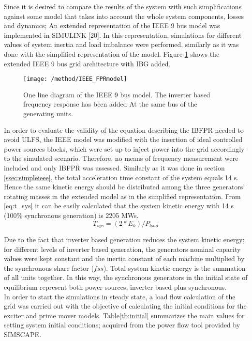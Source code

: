 Since it is desired to compare the results of the system with such simplifications against some model that takes into account the whole system components, losses and dynamics; An  extended representation of the IEEE 9 bus model was implemented in SIMULINK [20]. In this representation, simulations for different values of system inertia and load imbalance were performed, similarly as it was done with the simplified representation of the model. Figure \ref{fig:ieeeext} shows the extended IEEE 9 bus grid architecture with IBG added.\\
\begin{figure}[h]
	\centering
	\texttt{[image: /method/IEEE\_FPRmodel]}
	\caption{One line diagram of the IEEE 9 bus model. The inverter based frequency response has been added At the same bus of the generating units.}
	\label{fig:ieeeext}
\end{figure}
In order to evaluate the validity of the equation describing the IBFPR needed to avoid ULFS, the IEEE model was modified with the insertion of ideal controlled power sources blocks, which were set up to inject power into the grid accordingly to the simulated scenario. Therefore, no means of frequency measurement were included and only IBFPR was assessed.
Similarly as it was done in section \ref{ssec:simpleieee}, the total acceleration time constant of the system equals 14 s. Hence the same kinetic energy should be distributed among the three generators' rotating masses in the extended model as in the simplified representation. From \eqref{eq:t_sys} it can be easily calculated that the system kinetic energy with 14 s (100\% synchronous generation) is 2205 MWs.
\begin{equation}
	\label{eq:t_sys}
	T_{sys}=(2*E_{k})/P_{load}
\end{equation}
 
Due to the fact that inverter based generation reduces the system kinetic energy; for different levels of inverter based generation,  the generators nominal capacity values were kept constant and the inertia constant of each machine multiplied by the synchronous share factor ($ fss $). Total system kinetic energy is the summation of all units together. In this way, the synchronous generators in the initial state of equilibrium represent both power sources, inverter based plus synchronous.\\
In order to start the simulations in steady state, a load flow calculation of the grid was carried out with the objective of calculating the initial conditions for the exciter and prime mover models. 
Table\ref{tb:initial} summarizes the main values for setting system initial conditions; acquired from the power flow tool provided by SIMSCAPE.

